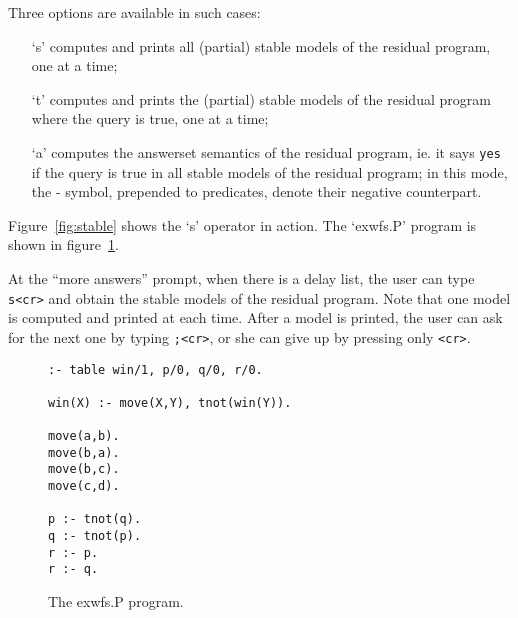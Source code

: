 Three options are available in such cases: 

\begin{enumerate}

\item[`s'] computes and prints all (partial) stable models of the residual
  program, one at a time;

\item[`t'] computes and prints the (partial) stable models of the residual
  program where the query is true, one at a time;

\item[`a'] computes the answerset semantics of the residual program,
  ie. it says \verb#yes# if the query is true in all stable models of the
  residual program; in this mode, the - symbol, prepended to
  predicates, denote their negative counterpart.


\end{enumerate}

Figure~\ref{fig:stable} shows the `s' operator in action. The
`exwfs.P' program is shown in figure~\ref{fig:exwfs}. 

At the ``more answers'' prompt, when there is a delay list, the user
can type \verb#s<cr># and obtain the stable models of the residual program.
Note that one model is computed and printed at each time. After a
model is printed, the user can ask for the next one by typing \verb#;<cr>#,
or she can give up by pressing only \verb#<cr>#.

\begin{figure}
\label{fig:exwfs}
\centering
\scriptsize
\begin{verbatim}
:- table win/1, p/0, q/0, r/0.

win(X) :- move(X,Y), tnot(win(Y)).

move(a,b).
move(b,a).
move(b,c).
move(c,d).

p :- tnot(q).
q :- tnot(p).
r :- p.
r :- q.
\end{verbatim}
\caption{The exwfs.P program.}
\end{figure}


